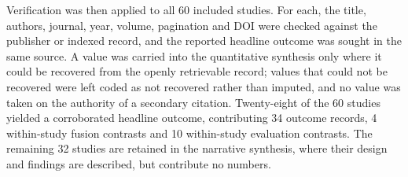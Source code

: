 \documentclass[11pt,a4paper]{article}
\begin{document}
Verification was then applied to all 60 included studies. For each, the title, authors,
journal, year, volume, pagination and DOI were checked against the publisher or indexed
record, and the reported headline outcome was sought in the same source. A value was carried
into the quantitative synthesis only where it could be recovered from the openly retrievable
record; values that could not be recovered were left coded as not recovered rather than
imputed, and no value was taken on the authority of a secondary citation. Twenty-eight of the
60 studies yielded a corroborated headline outcome, contributing 34 outcome records, 4
within-study fusion contrasts and 10 within-study evaluation contrasts. The remaining 32
studies are retained in the narrative synthesis, where their design and findings are
described, but contribute no numbers.
\end{document}
